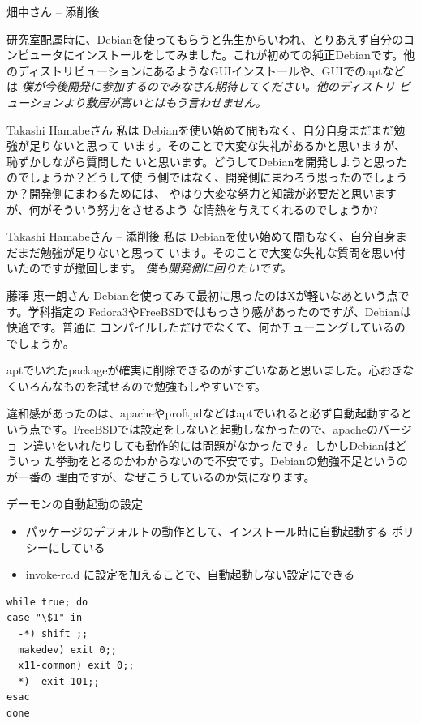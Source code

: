 \documentclass[cjk,dvipdfmx]{beamer}
\begin{document}
\begin{frame}{畑中さん -- 添削後}

研究室配属時に、Debianを使ってもらうと先生からいわれ、とりあえず自分のコ
ンピュータにインストールをしてみました。これが初めての純正Debianです。他
のディストリビューションにあるようなGUIインストールや、GUIでのaptなどは
{\em 僕が今後開発に参加するのでみなさん期待してください。他のディストリ
ビューションより敷居が高いとはもう言わせません。}

\end{frame}


\begin{frame}{Takashi Hamabeさん}
私は Debianを使い始めて間もなく、自分自身まだまだ勉強が足りないと思って
います。そのことで大変な失礼があるかと思いますが、恥ずかしながら質問した
いと思います。どうしてDebianを開発しようと思ったのでしょうか？どうして使
う側ではなく、開発側にまわろう思ったのでしょうか？開発側にまわるためには、
やはり大変な努力と知識が必要だと思いますが、何がそういう努力をさせるよう
な情熱を与えてくれるのでしょうか?
\end{frame}

\begin{frame}{Takashi Hamabeさん -- 添削後}
私は Debianを使い始めて間もなく、自分自身まだまだ勉強が足りないと思って
います。そのことで大変な失礼な質問を思い付いたのですが撤回します。
{\em 僕も開発側に回りたいです。}
\end{frame}

\begin{frame}{藤澤 恵一朗さん}
Debianを使ってみて最初に思ったのはXが軽いなあという点です。学科指定の
Fedora3やFreeBSDではもっさり感があったのですが、Debianは快適です。普通に
コンパイルしただけでなくて、何かチューニングしているのでしょうか。

aptでいれたpackageが確実に削除できるのがすごいなあと思いました。心おきな
くいろんなものを試せるので勉強もしやすいです。

違和感があったのは、apacheやproftpdなどはaptでいれると必ず自動起動すると
いう点です。FreeBSDでは設定をしないと起動しなかったので、apacheのバージョ
ン違いをいれたりしても動作的には問題がなかったです。しかしDebianはどういっ
た挙動をとるのかわからないので不安です。Debianの勉強不足というのが一番の
理由ですが、なぜこうしているのか気になります。
\end{frame}

\begin{frame}[containsverbatim]{デーモンの自動起動の設定}
\begin{itemize}
 \item パッケージのデフォルトの動作として、インストール時に自動起動する
       ポリシーにしている
 \item invoke-rc.d に設定を加えることで、自動起動しない設定にできる
\end{itemize} 
\begin{verbatim}
while true; do
case "\$1" in
  -*) shift ;;
  makedev) exit 0;;
  x11-common) exit 0;;
  *)  exit 101;;
esac
done
\end{verbatim}

\end{frame}
\end{document}
